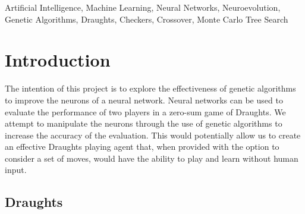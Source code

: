 \documentclass[12pt,a4paper]{article}
\begin{document}
\begin{abstract}
    {\bf Results}

    Overall, the neuroevolutionary approach ahs shown to learn and improve over time. The net learning rate was positive. However, the wide scope of the adjustments afforded may have impacted the learning rate and has consequently shown to be volatile at some situations. The use of crossovers may dramatically influence the quality of the learning.

    {\bf Conclusion}

    Under the premise that the fitness function is well defined, neuroevolution can be considered as an option to create a draughts playing AI. However, the robustness of the system is quite volatile. To counteract this, the system is  best paired with mutation and crossover methods that are not heavily reliant on entropy.

\end{abstract}
\begin{keywords}
    Artificial Intelligence, Machine Learning, Neural Networks, Neuroevolution, Genetic Algorithms, Draughts, Checkers, Crossover, Monte Carlo Tree Search
\end{keywords}
\section{Introduction}
    The intention of this project is to explore the effectiveness of genetic algorithms to improve the neurons of a neural network. Neural networks can be used to evaluate the performance of two players in a zero-sum game of Draughts. We attempt to manipulate the neurons through the use of genetic algorithms to increase the accuracy of the evaluation. This would potentially allow us to create an effective Draughts playing agent that, when provided with the option to consider a set of moves, would have the ability to play and learn without human input.

    \subsection{Draughts}
\end{document}
